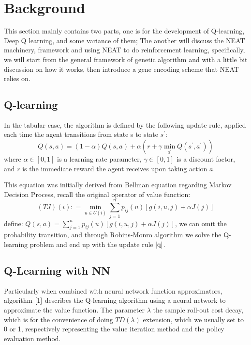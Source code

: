 \documentclass{article}
\begin{document}
\section{Background}
This section mainly contains two parts, one is for the development of Q-learning, Deep Q learning, and some variance of them; The another will discuss the NEAT
machinery, framework and using NEAT to do reinforcement learning, specifically, we will start from the general framework of genetic algorithm and with a little bit discussion
on how it works, then introduce a gene encoding scheme that NEAT relies on.
\subsection{Q-learning}

In the tabular case, the algorithm is defined by the following update rule, applied each time the agent transitions from state s to state $s^{\prime}$:
\begin{equation}
   Q(s,a ) = (1 - \alpha) Q(s, a) + \alpha( r + \gamma  \min_{a^{\prime}}Q(s^{\prime} ,a^{\prime}) ) \label{q}
\end{equation}
where $\alpha \in [0, 1]$ is a learning rate parameter, $\gamma \in [0, 1]$ is a discount factor, and $r$ is the immediate reward the agent receives upon taking action $a$.

This equation was initially derived from Bellman equation regarding Markov Decision Process, recall the original operator of value function:
\begin{equation}
  (TJ)(i) : = \min_{u \in U(i)} \sum_{j=1}^{n} p_{ij}(u)[g(i,u,j)+ \alpha J(j)]
\end{equation} 
define: $Q(s,a) = \sum_{j=1}^{n} p_{ij}(u)[g(i,u,j)+ \alpha J(j)]$, we can omit the probability transition, and through Robins-Monro algorithm
we solve the Q-learning problem and end up with the update rule $\ref{q}$.

 
 \subsection{Q-Learning with NN}

 Particularly when combined with neural network function approximators, 
 algorithm $\ref{1}$ describes the Q-learning algorithm using a neural network to approximate the value function.  
   The parameter $\lambda$ the sample roll-out cost decay, which is for the convenience of
  doing $TD(\lambda)$ extension, which we usually set to 0 or 1, respectively representing the value iteration method and the policy evaluation method.
\end{document}
